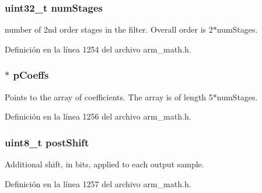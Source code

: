 \subsubsection[{\texorpdfstring{num\+Stages}{numStages}}]{\setlength{\rightskip}{0pt plus 5cm}uint32\+\_\+t num\+Stages}\hypertarget{structarm__biquad__casd__df1__inst__q31_aed9c8a6224cd149e8e12b17b25b9b767}{}\label{structarm__biquad__casd__df1__inst__q31_aed9c8a6224cd149e8e12b17b25b9b767}
number of 2nd order stages in the filter. Overall order is 2$\ast$num\+Stages. 

Definición en la línea 1254 del archivo arm\+\_\+math.\+h.

\subsubsection[{\texorpdfstring{p\+Coeffs}{pCoeffs}}]{$\ast$ p\+Coeffs}\hypertarget{structarm__biquad__casd__df1__inst__q31_a68888e36167d81cb7836db10367a1682}{}\label{structarm__biquad__casd__df1__inst__q31_a68888e36167d81cb7836db10367a1682}
Points to the array of coefficients. The array is of length 5$\ast$num\+Stages. 

Definición en la línea 1256 del archivo arm\+\_\+math.\+h.

\subsubsection[{\texorpdfstring{post\+Shift}{postShift}}]{\setlength{\rightskip}{0pt plus 5cm}uint8\+\_\+t post\+Shift}\hypertarget{structarm__biquad__casd__df1__inst__q31_a74050e9f36542bd56f4052381a82ae8f}{}\label{structarm__biquad__casd__df1__inst__q31_a74050e9f36542bd56f4052381a82ae8f}
Additional shift, in bits, applied to each output sample. 

Definición en la línea 1257 del archivo arm\+\_\+math.\+h.

